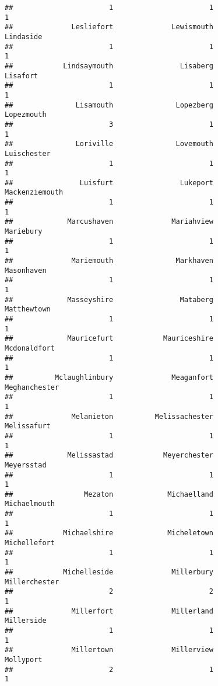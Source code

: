 \documentclass[
]{article}
\begin{document}
\begin{verbatim}
##                       1                       1                       1 
##              Lesliefort              Lewismouth               Lindaside 
##                       1                       1                       1 
##            Lindsaymouth                Lisaberg                Lisafort 
##                       1                       1                       1 
##               Lisamouth               Lopezberg              Lopezmouth 
##                       3                       1                       1 
##               Loriville               Lovemouth             Luischester 
##                       1                       1                       1 
##                Luisfurt                Lukeport          Mackenziemouth 
##                       1                       1                       1 
##             Marcushaven              Mariahview               Mariebury 
##                       1                       1                       1 
##              Mariemouth               Markhaven              Masonhaven 
##                       1                       1                       1 
##             Masseyshire                Mataberg             Matthewtown 
##                       1                       1                       1 
##             Mauricefurt            Mauriceshire            Mcdonaldfort 
##                       1                       1                       1 
##          Mclaughlinbury              Meaganfort           Meghanchester 
##                       1                       1                       1 
##              Melanieton          Melissachester             Melissafurt 
##                       1                       1                       1 
##             Melissastad            Meyerchester              Meyersstad 
##                       1                       1                       1 
##                 Mezaton             Michaelland            Michaelmouth 
##                       1                       1                       1 
##            Michaelshire             Micheletown            Michellefort 
##                       1                       1                       1 
##            Michelleside              Millerbury           Millerchester 
##                       2                       2                       1 
##              Millerfort              Millerland              Millerside 
##                       1                       1                       1 
##              Millertown              Millerview               Mollyport 
##                       2                       1                       1 

\end{verbatim}
\end{document}
